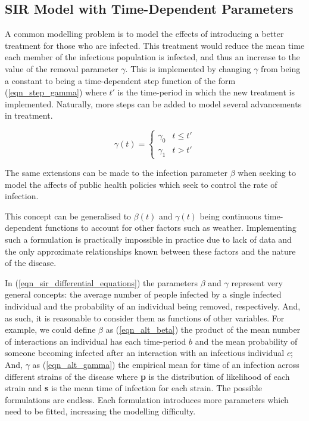 \documentclass[11pt,a4paper]{article}
\theoremstyle{break}
\begin{document}
\subsection*{SIR Model with Time-Dependent Parameters}

  \par A common modelling problem is to model the effects of introducing a better treatment for those who are infected. This treatment would reduce the mean time each member of the infectious population is infected, and thus an increase to the value of the removal parameter $\gamma$. This is implemented by changing $\gamma$ from being a constant to being a time-dependent step function of the form (\ref{eqn_step_gamma}) where $t'$ is the time-period in which the new treatment is implemented. Naturally, more steps can be added to model several advancements in treatment.

  \begin{equation}\label{eqn_step_gamma}
    \gamma(t)=\begin{cases}
      \gamma_0&t\leq t'\\
      \gamma_1&t>t'
    \end{cases}
  \end{equation}

  \par The same extensions can be made to the infection parameter $\beta$ when seeking to model the affects of public health policies which seek to control the rate of infection.

  \par This concept can be generalised to $\beta(t)$ and $\gamma(t)$ being continuous time-dependent functions to account for other factors such as weather. Implementing such a formulation is practically impossible in practice due to lack of data and the only approximate relationships known between these factors and the nature of the disease.

  \par In (\ref{eqn_sir_differential_equations}) the parameters $\beta$ and $\gamma$ represent very general concepts: the average number of people infected by a single infected individual and the probability of an individual being removed, respectively. And, as such, it is reasonable to consider them as functions of other variables. For example, we could define $\beta$ as (\ref{eqn_alt_beta}) the product of the mean number of interactions an individual has each time-period $b$ and the mean probability of someone becoming infected after an interaction with an infectious individual $c$; And, $\gamma$ as (\ref{eqn_alt_gamma}) the empirical mean for time of an infection across different strains of the disease where \textbf{p} is the distribution of likelihood of each strain and \textbf{s} is the mean time of infection for each strain. The possible formulations are endless. Each formulation introduces more parameters which need to be fitted, increasing the modelling difficulty.
\end{document}
